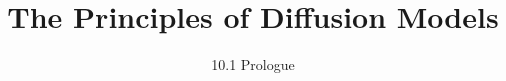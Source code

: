 
\title{The Principles of Diffusion Models}
\subtitle{10.1 Prologue}


\begin{frame}
    \titlepage
\end{frame}


